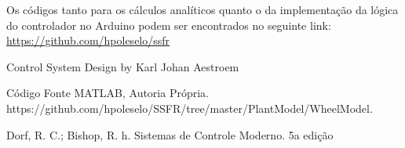\documentclass{article}
\begin{document}
Os códigos tanto para os cálculos analíticos quanto o da implementação da lógica do controlador no Arduino podem ser encontrados no seguinte link: \url{https://github.com/hpoleselo/ssfr}


  


\begin{thebibliography}{1}
Control System Design by Karl Johan Aestroem

Código Fonte MATLAB, Autoria Própria.
\newblock https://github.com/hpoleselo/SSFR/tree/master/PlantModel/WheelModel.

\newblock Dorf, R. C.; Bishop, R. h. Sistemas de Controle Moderno. 5a edição



\end{thebibliography}
\end{document}
